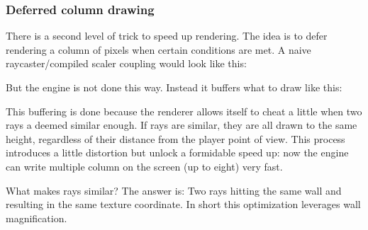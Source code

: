 \subsubsection{Deferred column drawing}
There is a second level of trick to speed up rendering. The idea is to defer rendering a column of pixels when certain conditions are met. A naive raycaster/compiled scaler coupling would look like this:\\

\begin{minipage}{\textwidth}

\end{minipage}
\par
But the engine is not done this way. Instead it buffers what to draw like this:\\
\par
\begin{minipage}{\textwidth}

\end{minipage}

\par
This buffering is done because the renderer allows itself to cheat a little when two rays a deemed similar enough. If rays are similar, they are all drawn to the same height, regardless of their distance from the player point of view. This process introduces a little distortion but unlock a formidable speed up: now the engine can write multiple column on the screen (up to eight) very fast.\\
\par
What makes rays similar? The answer is: Two rays hitting the same wall and resulting in the same  texture coordinate. In short this optimization leverages wall magnification.\\

